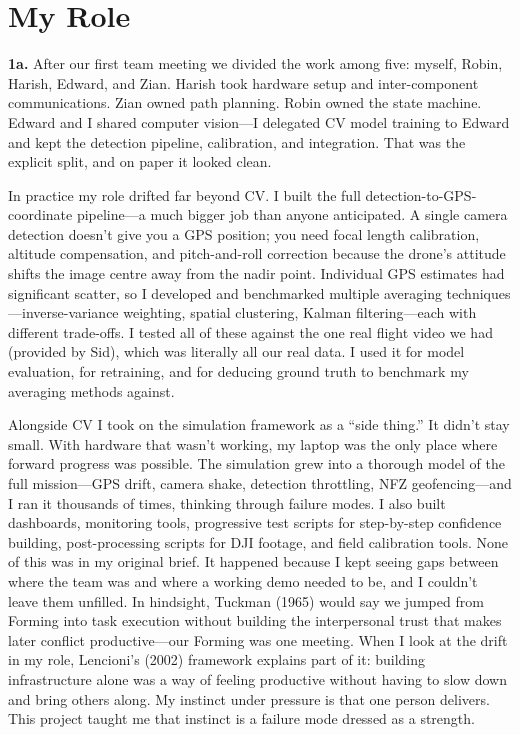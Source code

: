 \section{My Role}

\textbf{1a.}
After our first team meeting we divided the work among five: myself, Robin, Harish, Edward, and Zian. Harish took hardware setup and inter-component communications. Zian owned path planning. Robin owned the state machine. Edward and I shared computer vision---I delegated CV model training to Edward and kept the detection pipeline, calibration, and integration. That was the explicit split, and on paper it looked clean.

In practice my role drifted far beyond CV. I built the full detection-to-GPS-coordinate pipeline---a much bigger job than anyone anticipated. A single camera detection doesn't give you a GPS position; you need focal length calibration, altitude compensation, and pitch-and-roll correction because the drone's attitude shifts the image centre away from the nadir point. Individual GPS estimates had significant scatter, so I developed and benchmarked multiple averaging techniques---inverse-variance weighting, spatial clustering, Kalman filtering---each with different trade-offs. I tested all of these against the one real flight video we had (provided by Sid), which was literally all our real data. I used it for model evaluation, for retraining, and for deducing ground truth to benchmark my averaging methods against.

Alongside CV I took on the simulation framework as a ``side thing.'' It didn't stay small. With hardware that wasn't working, my laptop was the only place where forward progress was possible. The simulation grew into a thorough model of the full mission---GPS drift, camera shake, detection throttling, NFZ geofencing---and I ran it thousands of times, thinking through failure modes. I also built dashboards, monitoring tools, progressive test scripts for step-by-step confidence building, post-processing scripts for DJI footage, and field calibration tools. None of this was in my original brief. It happened because I kept seeing gaps between where the team was and where a working demo needed to be, and I couldn't leave them unfilled. In hindsight, Tuckman (1965) would say we jumped from Forming into task execution without building the interpersonal trust that makes later conflict productive---our Forming was one meeting. When I look at the drift in my role, Lencioni's (2002) framework explains part of it: building infrastructure alone was a way of feeling productive without having to slow down and bring others along. My instinct under pressure is that one person delivers. This project taught me that instinct is a failure mode dressed as a strength.

